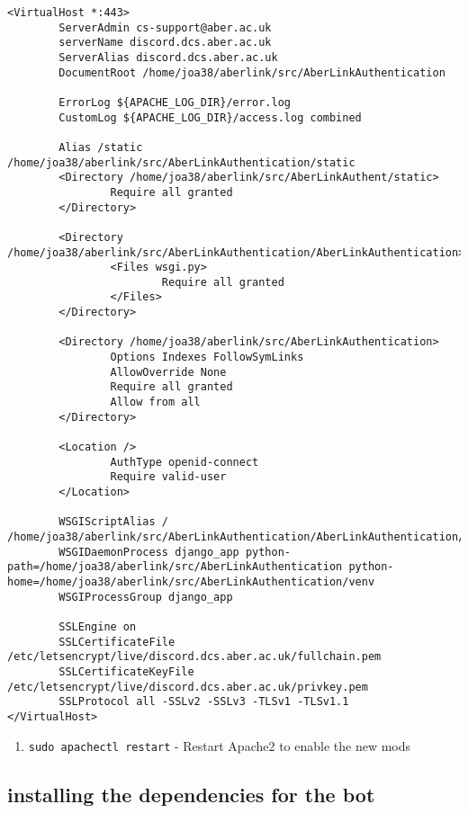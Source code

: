 \begin{lstlisting}
<VirtualHost *:443>
        ServerAdmin cs-support@aber.ac.uk
        serverName discord.dcs.aber.ac.uk
        ServerAlias discord.dcs.aber.ac.uk
        DocumentRoot /home/joa38/aberlink/src/AberLinkAuthentication

        ErrorLog ${APACHE_LOG_DIR}/error.log
        CustomLog ${APACHE_LOG_DIR}/access.log combined

        Alias /static /home/joa38/aberlink/src/AberLinkAuthentication/static
        <Directory /home/joa38/aberlink/src/AberLinkAuthent/static>
                Require all granted
        </Directory>

        <Directory /home/joa38/aberlink/src/AberLinkAuthentication/AberLinkAuthentication>
                <Files wsgi.py>
                        Require all granted
                </Files>
        </Directory>

        <Directory /home/joa38/aberlink/src/AberLinkAuthentication>
                Options Indexes FollowSymLinks
                AllowOverride None
                Require all granted
                Allow from all
        </Directory>

        <Location />
                AuthType openid-connect
                Require valid-user
        </Location>

        WSGIScriptAlias / /home/joa38/aberlink/src/AberLinkAuthentication/AberLinkAuthentication/wsgi.py
        WSGIDaemonProcess django_app python-path=/home/joa38/aberlink/src/AberLinkAuthentication python-home=/home/joa38/aberlink/src/AberLinkAuthentication/venv
        WSGIProcessGroup django_app

        SSLEngine on
        SSLCertificateFile /etc/letsencrypt/live/discord.dcs.aber.ac.uk/fullchain.pem
        SSLCertificateKeyFile /etc/letsencrypt/live/discord.dcs.aber.ac.uk/privkey.pem
        SSLProtocol all -SSLv2 -SSLv3 -TLSv1 -TLSv1.1
</VirtualHost>
\end{lstlisting}

\begin{enumerate}
\def\labelenumi{\arabic{enumi}.}
\setcounter{enumi}{6}
\itemsep1pt\parskip0pt
\item
  \texttt{sudo apachectl restart} - Restart Apache2 to enable the new
  mods
\end{enumerate}

\subsection{installing the dependencies for the
bot}\label{installing-the-dependencies-for-the-bot}

